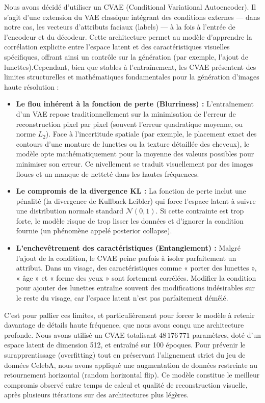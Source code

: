 \documentclass{article}
\begin{document}
Nous avons décidé d'utiliser un CVAE (Conditional Variational Autoencoder). Il s'agit d'une extension du VAE classique intégrant des conditions externes — dans notre cas, les vecteurs d'attributs faciaux (labels) — à la fois à l'entrée de l'encodeur et du décodeur. Cette architecture permet au modèle d'apprendre la corrélation explicite entre l'espace latent et des caractéristiques visuelles spécifiques, offrant ainsi un contrôle sur la génération (par exemple, l'ajout de lunettes).Cependant, bien que stables à l'entraînement, les CVAE présentent des limites structurelles et mathématiques fondamentales pour la génération d'images haute résolution :\begin{itemize}\item \textbf{Le flou inhérent à la fonction de perte (Blurriness) :} L'entraînement d'un VAE repose traditionnellement sur la minimisation de l'erreur de reconstruction pixel par pixel (souvent l'erreur quadratique moyenne, ou norme $L_2$). Face à l'incertitude spatiale (par exemple, le placement exact des contours d'une monture de lunettes ou la texture détaillée des cheveux), le modèle opte mathématiquement pour la moyenne des valeurs possibles pour minimiser son erreur. Ce nivellement se traduit visuellement par des images floues et un manque de netteté dans les hautes fréquences.\item \textbf{Le compromis de la divergence KL :} La fonction de perte inclut une pénalité (la divergence de Kullback-Leibler) qui force l'espace latent à suivre une distribution normale standard $\mathcal{N}(0, 1)$. Si cette contrainte est trop forte, le modèle risque de trop lisser les données et d'ignorer la condition fournie (un phénomène appelé posterior collapse).\item \textbf{L'enchevêtrement des caractéristiques (Entanglement) :} Malgré l'ajout de la condition, le CVAE peine parfois à isoler parfaitement un attribut. Dans un visage, des caractéristiques comme « porter des lunettes », « âge » et « forme des yeux » sont fortement corrélées. Modifier la condition pour ajouter des lunettes entraîne souvent des modifications indésirables sur le reste du visage, car l'espace latent n'est pas parfaitement démêlé.\end{itemize}C'est pour pallier ces limites, et particulièrement pour forcer le modèle à retenir davantage de détails haute fréquence, que nous avons conçu une architecture profonde. Nous avons utilisé un CVAE totalisant $48\,176\,771$ paramètres, doté d'un espace latent de dimension 512, et entraîné sur 100 époques. Pour prévenir le surapprentissage (overfitting) tout en préservant l'alignement strict du jeu de données CelebA, nous avons appliqué une augmentation de données restreinte au retournement horizontal (random horizontal flip). Ce modèle constitue le meilleur compromis observé entre temps de calcul et qualité de reconstruction visuelle, après plusieurs itérations sur des architectures plus légères.
\end{document}
